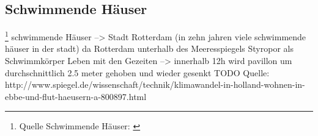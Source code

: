 \subsection{Schwimmende Häuser} \footnote{Quelle Schwimmende Häuser: \cite{schwimmende_haeuser}}
schwimmende Häuser
--> Stadt Rotterdam	(in zehn jahren viele schwimmende häuser in der stadt)
da Rotterdam unterhalb des Meeresspiegels
\newline\newline
Styropor als Schwimmkörper
\newline\newline
Leben mit den Gezeiten
--> innerhalb 12h wird pavillon um durchschnittlich 2.5 meter gehoben und wieder gesenkt
\newline\newline
TODO
Quelle: http://www.spiegel.de/wissenschaft/technik/klimawandel-in-holland-wohnen-in-ebbe-und-flut-haeusern-a-800897.html